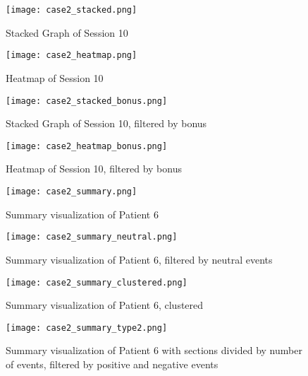 \begin{figure}
\centering
\texttt{[image: case2\_stacked.png]}
\caption{Stacked Graph of Session 10}
\label{fig:case2_stacked}
\end{figure}

\begin{figure}
\centering
\texttt{[image: case2\_heatmap.png]}
\caption{Heatmap of Session 10}
\label{fig:case2_heatmap}
\end{figure}

\begin{figure}
\centering
\texttt{[image: case2\_stacked\_bonus.png]}
\caption{Stacked Graph of Session 10, filtered by bonus}
\label{fig:case2_stacked_bonus}
\end{figure}

\begin{figure}
\centering
\texttt{[image: case2\_heatmap\_bonus.png]}
\caption{Heatmap of Session 10, filtered by bonus}
\label{fig:case2_heatmap_bonus}
\end{figure}

\begin{figure}
\centering
\texttt{[image: case2\_summary.png]}
\caption{Summary visualization of Patient 6}
\label{fig:case2_summary}
\end{figure}

\begin{figure}
\centering
\texttt{[image: case2\_summary\_neutral.png]}
\caption{Summary visualization of Patient 6, filtered by neutral events}
\label{fig:case2_summary_neutral}
\end{figure}

\begin{figure}
\centering
\texttt{[image: case2\_summary\_clustered.png]}
\caption{Summary visualization of Patient 6, clustered}
\label{fig:case2_summary_clustered}
\end{figure}

\begin{figure}
\centering
\texttt{[image: case2\_summary\_type2.png]}
\caption{Summary visualization of Patient 6 with sections divided by number of events, filtered by positive and negative events}
\label{fig:case2_summary_type2}
\end{figure}



